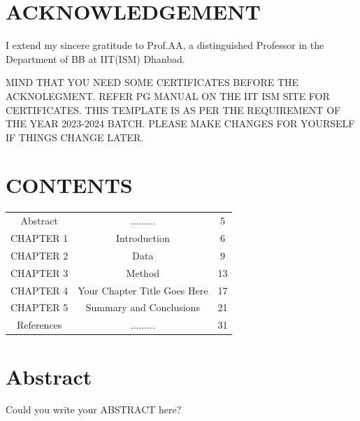\documentclass[12pt]{article}
\begin{document}

\newpage
\clearpage 
\setcounter{page}{1}  %


\section*{ACKNOWLEDGEMENT}
I extend my sincere gratitude to Prof.AA, a distinguished Professor in the Department of BB at IIT(ISM) Dhanbad. 

MIND THAT YOU NEED SOME CERTIFICATES BEFORE THE ACKNOLEGMENT. REFER PG MANUAL ON THE IIT ISM SITE FOR CERTIFICATES. 
THIS TEMPLATE IS AS PER THE REQUIREMENT OF THE YEAR 2023-2024 BATCH. PLEASE MAKE CHANGES FOR YOURSELF IF THINGS CHANGE LATER.


\newpage
\section*{CONTENTS}
\begin{tabular}{ccc}

 Abstract  &  .........                  &  5 \\
CHAPTER 1  & Introduction                &  6 \\
CHAPTER 2  &  Data                       &  9 \\
CHAPTER 3  & Method                      &  13 \\
CHAPTER 4  & Your Chapter Title Goes Here   &  17 \\
CHAPTER 5  &  Summary and Conclusions    &  21 \\
References & .........                   & 31

\end{tabular}

\newpage
\section*{}
\listoftables


\section*{}
\listoffigures

\newpage
\section*{Abstract}
Could you write your ABSTRACT here?
\end{document}
